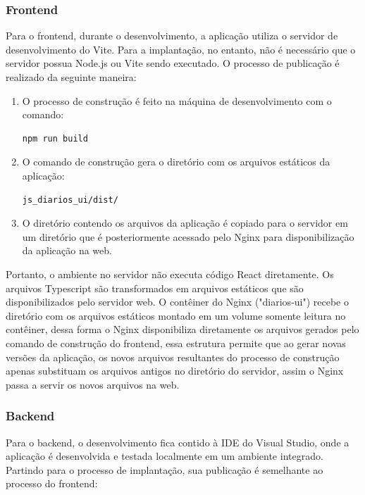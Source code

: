 \subsubsection{Frontend}
Para o frontend, durante o desenvolvimento, a aplicação utiliza o servidor de desenvolvimento do Vite. Para a implantação, no entanto, não é necessário que o servidor possua Node.js ou Vite sendo executado. O processo de publicação é realizado da seguinte maneira:

\begin{enumerate}
    \item O processo de construção é feito na máquina de desenvolvimento com o comando:
\begin{lstlisting}[caption={}, label={run:npm_build}, language=bash]
npm run build
\end{lstlisting}\noindent
    \item O comando de construção gera o diretório com os arquivos estáticos da aplicação:
\begin{lstlisting}[caption={}, label={run:npm_build_dir}, language=bash]
js_diarios_ui/dist/
\end{lstlisting}\noindent
    \item O diretório contendo os arquivos da aplicação é copiado para o servidor em um diretório que é posteriormente acessado pelo Nginx para disponibilização da aplicação na web.
\end{enumerate}

Portanto, o ambiente no servidor não executa código React diretamente. Os arquivos Typescript são transformados em arquivos estáticos que são disponibilizados pelo servidor web. O contêiner do Nginx ("diarios-ui") recebe o diretório com os arquivos estáticos montado em um volume somente leitura no contêiner, dessa forma o Nginx disponibiliza diretamente os arquivos gerados pelo comando de construção do frontend, essa estrutura permite que ao gerar novas versões da aplicação, os novos arquivos resultantes do processo de construção apenas substituam os arquivos antigos no diretório do servidor, assim o Nginx passa a servir os novos arquivos na web.

\subsubsection{Backend}
Para o backend, o desenvolvimento fica contido à IDE do Visual Studio, onde a aplicação é desenvolvida e testada localmente em um ambiente integrado. Partindo para o processo de implantação, sua publicação é semelhante ao processo do frontend:

